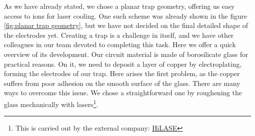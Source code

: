 As we have already stated, we chose a planar trap geometry, offering us easy access to ions for laser cooling. One such scheme was already shown in the figure \ref{fig:planar trap geometry}, but we have not decided on the final detailed shape of the electrodes yet. Creating a trap is a challenge in itself, and we have other colleagues in our team devoted to completing this task. Here we offer a quick overview of its development. Our circuit material is made of borosilicate glass for practical reasons. On it, we need to deposit a layer of copper by electroplating, forming the electrodes of our trap. Here arises the first problem, as the copper suffers from poor adhesion on the smooth surface of the glass. There are many ways to overcome this issue. We chose a straightforward one by roughening the glass mechanically with lasers\footnote{{This is carried out by the external company: \href{https://www.hilase.cz}{HiLASE}}}.
